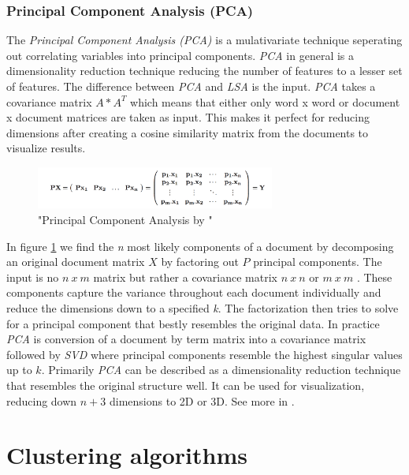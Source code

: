     \subsubsection{Principal Component Analysis (PCA)}
    The \emph{Principal Component Analysis (PCA)} is a mulativariate technique seperating out correlating variables into principal components. \emph{PCA} in general is a dimensionality reduction technique reducing the number of features to a lesser set of features. The difference between \emph{PCA} and \emph{LSA} is the input. \emph{PCA} takes a covariance matrix $A*A^{T}$ which means that either only word x word or document x document matrices are taken as input. This makes it perfect for reducing dimensions after creating a cosine similarity matrix from the documents to visualize results.

    \begin{figure}[h!]
      \centering
        \includegraphics[width=0.7\textwidth]{PCA.png}
        \caption{"Principal Component Analysis by \cite{PCA2009}"}
        \label{pca}
    \end{figure}

    In figure \ref{pca} we find the \emph{n} most likely components of a document by decomposing an original document matrix $X$ by factoring out $P$ principal components. The input is no $n\:x\:m$ matrix but rather a covariance matrix $n\:x\:n$ or $m\:x\:m$ . These components capture the variance throughout each document individually and reduce the dimensions down to a specified \emph{k}. The factorization then tries to solve for a principal component that bestly resembles the original data. In practice \emph{PCA} is conversion of a document by term matrix into a covariance matrix followed by \emph{SVD} where principal components resemble the highest singular values up to $k$. Primarily \emph{PCA} can be described as a dimensionality reduction technique that resembles the original structure well. It can be used for visualization, reducing down $n + 3$ dimensions to 2D or 3D. See more in \cite{PCA2009}.

\section{Clustering algorithms}
  
